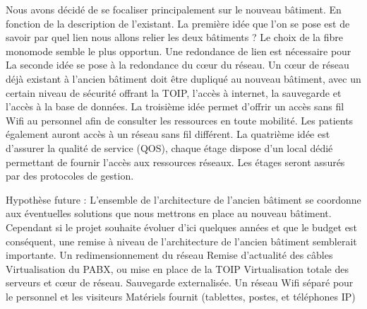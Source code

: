 Nous avons décidé de se focaliser principalement sur le nouveau bâtiment. En fonction de la description de l’existant.
La première idée que l’on se pose est de savoir par quel lien nous allons relier les deux bâtiments ? Le choix de la fibre monomode semble le plus opportun. Une redondance de lien est nécessaire pour
La seconde idée se pose à la redondance du cœur du réseau. Un cœur de réseau déjà existant à l’ancien bâtiment doit être dupliqué au nouveau bâtiment, avec un certain niveau de sécurité offrant la TOIP, l’accès à internet, la sauvegarde et l’accès à la base de données.
La troisième idée permet d’offrir un accès sans fil Wifi au personnel afin de consulter les ressources en toute mobilité. Les patients également auront accès à un réseau sans fil différent.
La quatrième idée est d’assurer la qualité de service (QOS), chaque étage dispose d’un local dédié permettant de fournir l’accès aux ressources réseaux. Les étages seront assurés par des protocoles de gestion.

Hypothèse future :
L’ensemble de l’architecture de l’ancien bâtiment se coordonne aux éventuelles solutions que nous mettrons en place au nouveau bâtiment. Cependant si le projet souhaite évoluer d’ici quelques années et que le budget est conséquent, une remise à niveau de l’architecture de l’ancien bâtiment semblerait importante.
Un redimensionnement du réseau
Remise d’actualité des câbles
Virtualisation du PABX, ou mise en place de la TOIP
Virtualisation totale des serveurs et cœur de réseau.
Sauvegarde externalisée.
Un réseau Wifi séparé pour le personnel et les visiteurs
Matériels fournit (tablettes, postes, et téléphones IP)


















